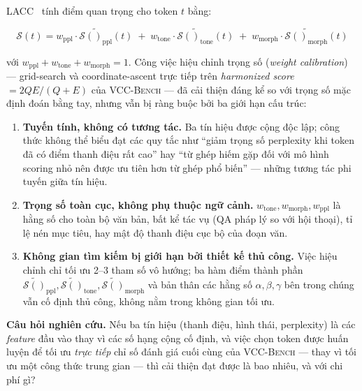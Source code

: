 \documentclass[12pt,a4paper]{article}
\newcommand{\score}[1]{\mathcal{S}(#1)}      %
\newcommand{\method}[1]{\textsc{#1}}         %
\begin{document}
\method{LACC}~\cite{lacc2026} tính điểm quan trọng cho token $t$ bằng:

\begin{equation}\label{eq:combined_current}
    \score{t} = w_{\text{ppl}} \cdot \tilde{\score{}_{\text{ppl}}}(t) \;+\; w_{\text{tone}} \cdot \tilde{\score{}_{\text{tone}}}(t) \;+\; w_{\text{morph}} \cdot \tilde{\score{}_{\text{morph}}}(t)
\end{equation}

với $w_{\text{ppl}} + w_{\text{tone}} + w_{\text{morph}} = 1$. Công việc hiệu chỉnh trọng số (\textit{weight calibration}) --- grid-search và coordinate-ascent trực tiếp trên \textit{harmonized score} $= 2QE/(Q+E)$ của \method{VCC-Bench} --- đã cải thiện đáng kể so với trọng số mặc định đoán bằng tay, nhưng vẫn bị ràng buộc bởi ba giới hạn cấu trúc:

\begin{enumerate}[label=\textbf{L\arabic*}:,leftmargin=*]
    \item \textbf{Tuyến tính, không có tương tác.} Ba tín hiệu được cộng độc lập; công thức không thể biểu đạt các quy tắc như ``giảm trọng số perplexity khi token đã có điểm thanh điệu rất cao'' hay ``từ ghép hiếm gặp đối với mô hình scoring nhỏ nên được ưu tiên hơn từ ghép phổ biến'' --- những tương tác phi tuyến giữa tín hiệu.
    \item \textbf{Trọng số toàn cục, không phụ thuộc ngữ cảnh.} $w_{\text{tone}}, w_{\text{morph}}, w_{\text{ppl}}$ là hằng số cho toàn bộ văn bản, bất kể tác vụ (QA pháp lý so với hội thoại), tỉ lệ nén mục tiêu, hay mật độ thanh điệu cục bộ của đoạn văn.
    \item \textbf{Không gian tìm kiếm bị giới hạn bởi thiết kế thủ công.} Việc hiệu chỉnh chỉ tối ưu 2--3 tham số vô hướng; ba hàm điểm thành phần $\tilde{\score{}}_{\text{ppl}}, \tilde{\score{}}_{\text{tone}}, \tilde{\score{}}_{\text{morph}}$ và bản thân các hằng số $\alpha, \beta, \gamma$ bên trong chúng vẫn cố định thủ công, không nằm trong không gian tối ưu.
\end{enumerate}

\textbf{Câu hỏi nghiên cứu.} Nếu ba tín hiệu (thanh điệu, hình thái, perplexity) là các \textit{feature} đầu vào thay vì các số hạng cộng cố định, và việc chọn token được huấn luyện để tối ưu \emph{trực tiếp} chỉ số đánh giá cuối cùng của \method{VCC-Bench} --- thay vì tối ưu một công thức trung gian --- thì cải thiện đạt được là bao nhiêu, và với chi phí gì?


\end{document}
